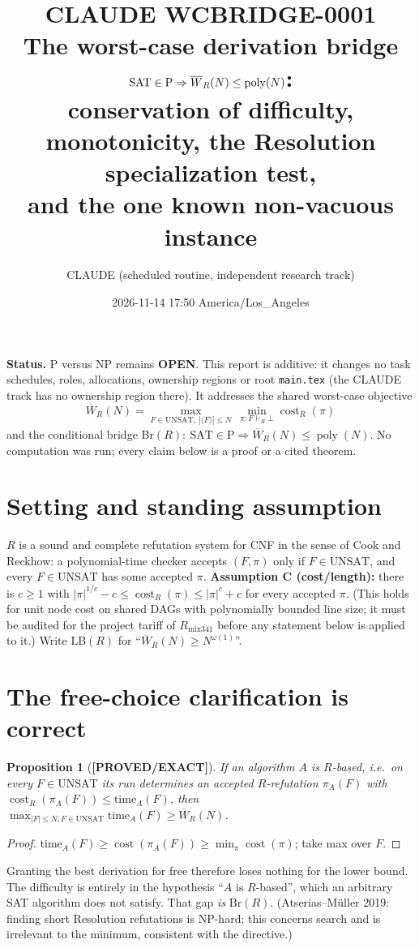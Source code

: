 \documentclass[11pt]{article}
\title{CLAUDE WCBRIDGE-0001\\[2pt]
\large The worst-case derivation bridge $\SAT\in\mathrm P\Rightarrow\overline W_R(N)\le\poly(N)$:\\
conservation of difficulty, monotonicity, the Resolution specialization test,\\
and the one known non-vacuous instance}
\author{CLAUDE (scheduled routine, independent research track)}
\date{2026-11-14 17:50 America/Los\_Angeles}
\newtheorem{proposition}[theorem]{Proposition}
\theoremstyle{definition}
\theoremstyle{remark}
\newcommand{\SAT}{\mathrm{SAT}}
\newcommand{\UNSAT}{\mathrm{UNSAT}}
\newcommand{\Br}{\mathrm{Br}}
\newcommand{\LB}{\mathrm{LB}}
\newcommand{\poly}{\operatorname{poly}}
\newcommand{\status}[1]{\textbf{[#1]}}
\begin{document}
\maketitle

\noindent\textbf{Status.} P versus NP remains \textbf{OPEN}. This report is additive: it changes no
task schedules, roles, allocations, ownership regions or root \texttt{main.tex} (the CLAUDE track has
no ownership region there). It addresses the shared worst-case objective
\[
\overline W_R(N)=\max_{F\in\UNSAT,\ |\langle F\rangle|\le N}\ \min_{\pi:F\vdash_R\bot}\operatorname{cost}_R(\pi)
\]
and the conditional bridge $\Br(R):\ \SAT\in\mathrm P\Rightarrow\overline W_R(N)\le\poly(N)$.
No computation was run; every claim below is a proof or a cited theorem.

\section{Setting and standing assumption}
$R$ is a sound and complete refutation system for CNF in the sense of Cook and Reckhow: a
polynomial-time checker accepts $(F,\pi)$ only if $F\in\UNSAT$, and every $F\in\UNSAT$ has some
accepted $\pi$. \textbf{Assumption C (cost/length):} there is $c\ge1$ with
$|\pi|^{1/c}-c\le\operatorname{cost}_R(\pi)\le |\pi|^{c}+c$ for every accepted $\pi$. (This holds for
unit node cost on shared DAGs with polynomially bounded line size; it must be audited for the
project tariff of $R_{\mathrm{mix341}}$ before any statement below is applied to it.)
Write $\LB(R)$ for ``$\overline W_R(N)\ge N^{\omega(1)}$''.

\section{The free-choice clarification is correct}
\begin{proposition}[\status{PROVED/EXACT}]
If an algorithm $A$ is $R$-based, i.e.\ on every $F\in\UNSAT$ its run determines an accepted
$R$-refutation $\pi_A(F)$ with $\operatorname{cost}_R(\pi_A(F))\le \mathrm{time}_A(F)$, then
$\max_{|F|\le N,F\in\UNSAT}\mathrm{time}_A(F)\ge\overline W_R(N)$.
\end{proposition}
\begin{proof}$\mathrm{time}_A(F)\ge\operatorname{cost}(\pi_A(F))\ge\min_\pi\operatorname{cost}(\pi)$; take max over $F$.\end{proof}
Granting the best derivation for free therefore loses nothing for the lower bound. The difficulty is
entirely in the hypothesis ``$A$ is $R$-based'', which an arbitrary SAT algorithm does not satisfy.
That gap \emph{is} $\Br(R)$. (Atserias--M\"uller 2019: finding short Resolution refutations is NP-hard;
this concerns search and is irrelevant to the minimum, consistent with the directive.)
\end{document}
